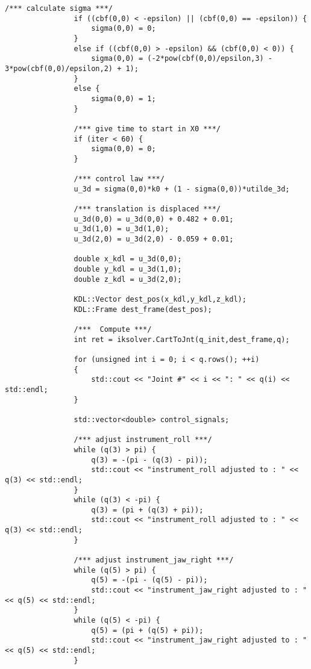 \begin{lstlisting}[language=gedit]
                /*** calculate sigma ***/
                if ((cbf(0,0) < -epsilon) || (cbf(0,0) == -epsilon)) {
                    sigma(0,0) = 0;
                }
                else if ((cbf(0,0) > -epsilon) && (cbf(0,0) < 0)) {
                    sigma(0,0) = (-2*pow(cbf(0,0)/epsilon,3) - 3*pow(cbf(0,0)/epsilon,2) + 1);
                }
                else {
                    sigma(0,0) = 1;
                }
        
                /*** give time to start in X0 ***/
                if (iter < 60) {
                    sigma(0,0) = 0;
                }
 
                /*** control law ***/
                u_3d = sigma(0,0)*k0 + (1 - sigma(0,0))*utilde_3d;

                /*** translation is displaced ***/
                u_3d(0,0) = u_3d(0,0) + 0.482 + 0.01;
                u_3d(1,0) = u_3d(1,0);
                u_3d(2,0) = u_3d(2,0) - 0.059 + 0.01;

                double x_kdl = u_3d(0,0);  
                double y_kdl = u_3d(1,0);  
                double z_kdl = u_3d(2,0);  
              
                KDL::Vector dest_pos(x_kdl,y_kdl,z_kdl);
                KDL::Frame dest_frame(dest_pos);

                /***  Compute ***/
                int ret = iksolver.CartToJnt(q_init,dest_frame,q);
                
                for (unsigned int i = 0; i < q.rows(); ++i)
                {
                    std::cout << "Joint #" << i << ": " << q(i) << std::endl;
                }	

                std::vector<double> control_signals;

                /*** adjust instrument_roll ***/
                while (q(3) > pi) {
                    q(3) = -(pi - (q(3) - pi));
                    std::cout << "instrument_roll adjusted to : " << q(3) << std::endl;
                }
                while (q(3) < -pi) {  
                    q(3) = (pi + (q(3) + pi));
                    std::cout << "instrument_roll adjusted to : " << q(3) << std::endl;
                }

                /*** adjust instrument_jaw_right ***/
                while (q(5) > pi) {
                    q(5) = -(pi - (q(5) - pi));
                    std::cout << "instrument_jaw_right adjusted to : " << q(5) << std::endl;
                }
                while (q(5) < -pi) {  
                    q(5) = (pi + (q(5) + pi));
                    std::cout << "instrument_jaw_right adjusted to : " << q(5) << std::endl;
                }


\end{lstlisting}
